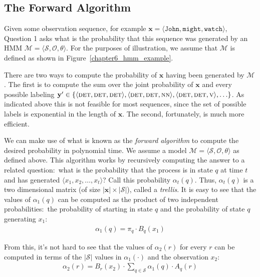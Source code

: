 \subsection{The Forward Algorithm}
\label{chapter6_forward}

Given some observation sequence, for example $\textbf{x} = \langle
\texttt{John}, \texttt{might}, \texttt{watch} \rangle$, Question 1 asks
what is the probability that this sequence was generated by an HMM
$\mathcal{M} = \langle \mathcal{S}, \mathcal{O}, \theta \rangle$.  For
the purposes of illustration, we assume that $\mathcal{M}$ is defined
as shown in Figure~\ref{chapter6_hmm_example}.

There are two ways to compute the probability of $\textbf{x}$ having
been generated by $\mathcal{M}$.  The first is to compute the sum over
the joint probability of $\textbf{x}$ and every possible labeling
$\textbf{y}' \in \{ \langle \textsc{det} , \textsc{det}, \textsc{det}
\rangle, \langle \textsc{det} , \textsc{det}, \textsc{nn} \rangle,
\langle \textsc{det} , \textsc{det}, \textsc{v} \rangle , \ldots \}$.
As indicated above this is not feasible for most sequences, since the
set of possible labels is exponential in the length of $\textbf{x}$.
The second, fortunately, is much more efficient.

We can make use of what is known as the \emph{forward algorithm} to
compute the desired probability in polynomial time.  We assume a model
$\mathcal{M} = \langle \mathcal{S}, \mathcal{O}, \theta \rangle$ as
defined above.  This algorithm works by recursively computing the
answer to a related question:\ what is the probability that the
process is in state $q$ at time $t$ and has generated $\langle x_1,
x_2, \ldots , x_t \rangle$?  Call this probability $\alpha_t(q)$.
Thus, $\alpha_t(q)$ is a two dimensional matrix (of size $|\textbf{x}|
\times |\mathcal{S}|$), called a \emph{trellis}.  It is easy to see
that the values of $\alpha_1(q)$ can be computed as the product of two
independent probabilities:\ the probability of starting in state $q$
and the probability of state $q$ generating $x_1$:
\begin{align}
\alpha_1(q) = \pi_q \cdot B_q(x_1)
\end{align}

\noindent From this, it's not hard to see that the values of
$\alpha_2(r)$ for every $r$ can be computed in terms of the
$|\mathcal{S}|$ values in $\alpha_1(\cdot)$ and the observation $x_2$:
\begin{align}
\alpha_2(r) =  B_r(x_2) \cdot \sum_{q \in \mathcal{S}} \alpha_1(q) \cdot A_q(r)
\end{align}

